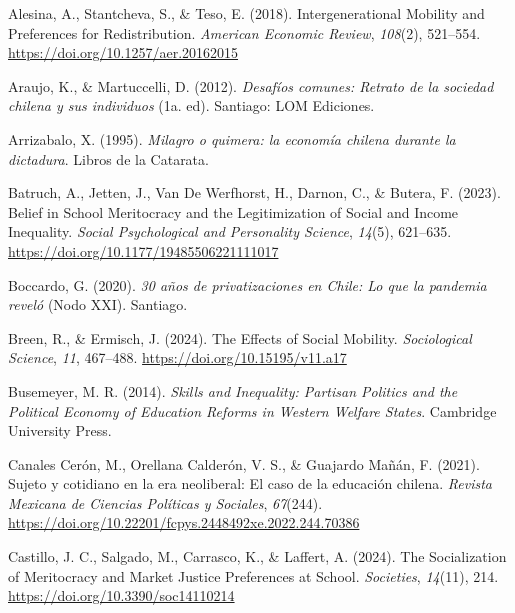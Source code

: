 \documentclass[
  12pt,
]{article}
\newlength{\cslhangindent}
\newenvironment{CSLReferences}[2] %
 {\begin{list}{}{%
  \setlength{\itemindent}{0pt}
  \setlength{\leftmargin}{0pt}
  \setlength{\parsep}{0pt}
  \ifodd #1
   \setlength{\leftmargin}{\cslhangindent}
   \setlength{\itemindent}{-1\cslhangindent}
  \fi
  \setlength{\itemsep}{#2\baselineskip}}}
 {\end{list}}
\begin{document}
\label{refs}
\begin{CSLReferences}{1}{0}
Alesina, A., Stantcheva, S., \& Teso, E. (2018). Intergenerational
{Mobility} and {Preferences} for {Redistribution}. \emph{American
Economic Review}, \emph{108}(2), 521--554.
\url{https://doi.org/10.1257/aer.20162015}

Araujo, K., \& Martuccelli, D. (2012). \emph{Desaf{í}os comunes: Retrato
de la sociedad chilena y sus individuos} (1a. ed). Santiago: LOM
Ediciones.

Arrizabalo, X. (1995). \emph{{Milagro o quimera: la econom{í}a chilena
durante la dictadura}}. Libros de la Catarata.

Batruch, A., Jetten, J., Van De Werfhorst, H., Darnon, C., \& Butera, F.
(2023). Belief in {School Meritocracy} and the {Legitimization} of
{Social} and {Income Inequality}. \emph{Social Psychological and
Personality Science}, \emph{14}(5), 621--635.
\url{https://doi.org/10.1177/19485506221111017}

Boccardo, G. (2020). \emph{30 a{ñ}os de privatizaciones en {Chile}: Lo
que la pandemia revel{ó}} (Nodo XXI). Santiago.

Breen, R., \& Ermisch, J. (2024). The {Effects} of {Social Mobility}.
\emph{Sociological Science}, \emph{11}, 467--488.
\url{https://doi.org/10.15195/v11.a17}

Busemeyer, M. R. (2014). \emph{Skills and {Inequality}: {Partisan
Politics} and the {Political Economy} of {Education Reforms} in {Western
Welfare States}}. Cambridge University Press.

Canales Cerón, M., Orellana Calderón, V. S., \& Guajardo Mañán, F.
(2021). Sujeto y cotidiano en la era neoliberal: El caso de la
educaci{ó}n chilena. \emph{Revista Mexicana de Ciencias Pol{í}ticas y
Sociales}, \emph{67}(244).
\url{https://doi.org/10.22201/fcpys.2448492xe.2022.244.70386}

Castillo, J. C., Salgado, M., Carrasco, K., \& Laffert, A. (2024). The
{Socialization} of {Meritocracy} and {Market Justice Preferences} at
{School}. \emph{Societies}, \emph{14}(11), 214.
\url{https://doi.org/10.3390/soc14110214}


\end{CSLReferences}
\end{document}
